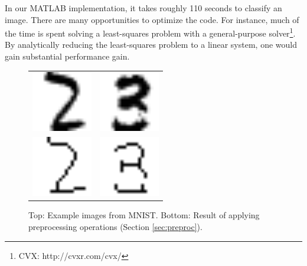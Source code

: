 \documentclass[oribibl]{llncs}
\begin{document}
In our MATLAB implementation, it takes roughly 110 seconds to classify an image.
There are many opportunities to optimize the code.
For instance, much of the time is spent solving a least-squares problem with a general-purpose solver\footnote{CVX: http://cvxr.com/cvx/}.
By analytically reducing the least-squares problem to a linear system, one would gain substantial performance gain.

\begin{figure}
\centering
\begin{tabular}{cc}
\includegraphics[width=.2\linewidth]{figs/Imnist_3749.png} & \includegraphics[width=.2\linewidth]{figs/Imnist_1960.png} \\
\includegraphics[width=.2\linewidth]{figs/Imnist_proc_1.png} & \includegraphics[width=.2\linewidth]{figs/Imnist_proc_16.png} \\
\end{tabular}
\caption{Top: Example images from MNIST. Bottom: Result of applying preprocessing operations (Section \ref{sec:preproc}).}
\label{fig:mnist_imgs}
\end{figure}
\end{document}
